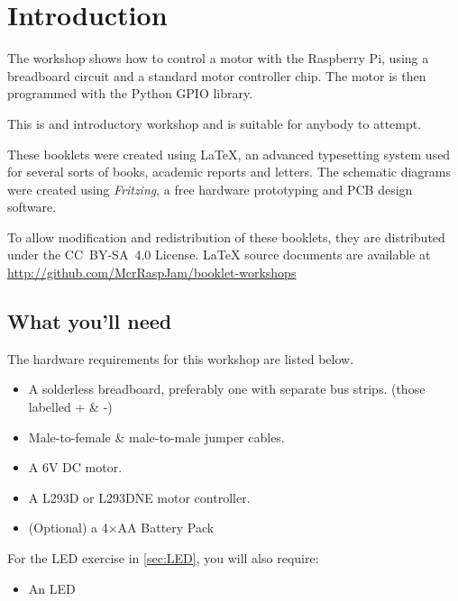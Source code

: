 \setcounter{section}{-1}
\section{Introduction}
	
	
	The workshop shows how to control a motor with the Raspberry Pi, using a breadboard circuit and a standard motor controller chip. The motor is then programmed with the Python GPIO library.

	This is and introductory workshop and is suitable for anybody to attempt.
		
	These booklets were created using {\selectfont \LaTeX}, an advanced typesetting system used for several sorts of books, academic reports and letters. The schematic diagrams were created using \textit{Fritzing}, a free hardware prototyping and PCB design software.
		
	To allow modification and redistribution of these booklets, they are distributed under the \hbox{CC BY-SA 4.0} License. LaTeX source documents are available at \url{http://github.com/McrRaspJam/booklet-workshops}
	
	
	\subsection*{What you'll need}
		
			
		The hardware requirements for this workshop are listed below.
	
		\begin{itemize}[nosep]		
			\item A solderless breadboard, preferably one with separate bus strips. (those labelled + \& -)
			\item Male-to-female \& male-to-male jumper cables.
			\item A 6V DC motor.
			\item A L293D or L293DNE motor controller.
			\item (Optional) a 4$\times$AA Battery Pack				
		\end{itemize}

		For the LED exercise in \autoref{sec:LED}, you will also require:
			
		\begin{itemize}[nosep]	
			\item An LED
			\item A $\sim 330 \Omega$ Resistor
		\end{itemize}
				
	
			
	
		
	\subsection*{Questions?}
		If you get stuck, find errors or have feedback about these booklets, email:
		\url{jam@jackjkelly.com}\label{email}